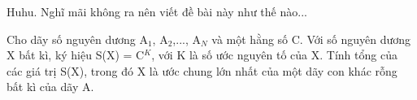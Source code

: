 Huhu. Nghĩ mãi không ra nên viết đề bài này như thế nào...

Cho dãy số nguyên dương A$_1$, A$_2$,..., A$_N$ và một hằng số C. Với số nguyên dương X bất kì, ký hiệu S(X) = C$^K$, với K là số ước nguyên tố của X. Tính tổng của các giá trị S(X), trong đó X là ước chung lớn nhất của một dãy con khác rỗng bất kì của dãy A.